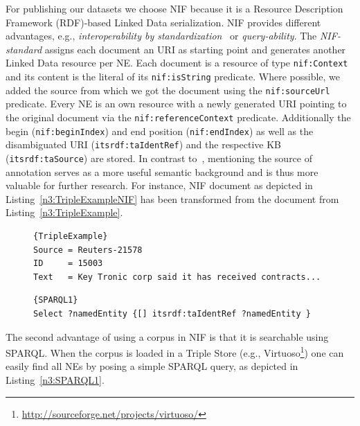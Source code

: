 For publishing our datasets we choose NIF because it is a Resource Description Framework (RDF)-based Linked Data serialization.
NIF provides different advantages, e.g., \emph{interoperability by standardization}~\cite{ISWC2013NIF} or \emph{query-ability}.
The \emph{NIF-standard} assigns each document an URI as starting point and generates another Linked Data resource per NE.
Each document is a resource of type \texttt{nif:Context} and its content is the literal of its \texttt{nif:isString} predicate. 
Where possible, we added the source from which we got the document using the \texttt{nif:sourceUrl} predicate.
Every NE is an own resource with a newly generated URI pointing to the original document via the \texttt{nif:referenceContext} predicate.
Additionally the begin (\texttt{nif:beginIndex}) and end position (\texttt{nif:endIndex}) as well as the disambiguated URI (\texttt{itsrdf:taIdentRef}) and the respective KB (\texttt{itsrdf:taSource}) are stored.
In contrast to~\cite{NEDstatBench}, mentioning the source of annotation serves as a more useful semantic background and is thus more valuable for further research.
For instance, NIF document as depicted in Listing~\ref{n3:TripleExampleNIF} has been transformed from the document from Listing~\ref{n3:TripleExample}.

\begin{figure}[tb]
\begin{lstlisting}[label=n3:TripleExample,caption=example input text.]{TripleExample}
Source = Reuters-21578
ID     = 15003
Text   = Key Tronic corp said it has received contracts...
\end{lstlisting}
\end{figure}

\begin{figure}[tb]
\begin{lstlisting}[label=n3:SPARQL1,caption=SPARQL query to get all NEs.]{SPARQL1}
Select ?namedEntity {[] itsrdf:taIdentRef ?namedEntity }
\end{lstlisting}
\end{figure}


The second advantage of using a corpus in NIF is that it is searchable using SPARQL.
When the corpus is loaded in a Triple Store (e.g., Virtuoso\footnote{\url{http://sourceforge.net/projects/virtuoso/}}) one can easily find all NEs by posing a simple SPARQL query, as depicted in Listing~\ref{n3:SPARQL1}.


